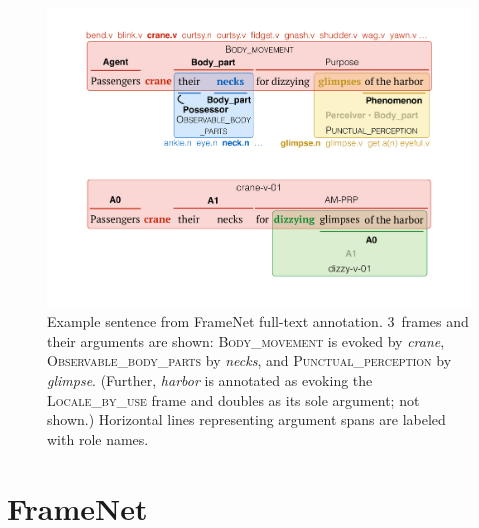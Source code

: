 \documentclass[11pt,a4paper]{article}
\newcommand{\ensuretext}[1]{#1}
\newcommand{\nssmarker}{\ensuretext{\textcolor{magenta}{\ensuremath{^{\textsc{NS}}_{\textsc{S}}}}}}
\newcommand{\arkcomment}[3]{\ensuretext{\textcolor{#3}{[#1 #2]}}}
\newcommand{\nss}[1]{\arkcomment{\nssmarker}{#1}{magenta}}
\newcommand{\fnf}[1]{\textsc{\textsf{#1}}} %
\begin{document}
\begin{figure}
\includegraphics[width=\columnwidth]{fig/harbor-fn.pdf}
\caption{Example sentence from FrameNet full-text annotation. 
3~frames and their arguments are shown: 
\fnf{Body\_movement} is evoked by \textit{crane},
\fnf{Observable\_body\_parts} by \textit{necks}, 
and \fnf{Punctual\_perception} by \textit{glimpse}.
(Further, \textit{harbor} is annotated as evoking the \fnf{Locale\_by\_use} frame 
and doubles as its sole argument; not shown.) 
Horizontal lines representing argument spans 
are labeled with role names.}
\label{fig:harbor-fn}
\end{figure}







\section{FrameNet}\label{sec:fn}

\end{document}
